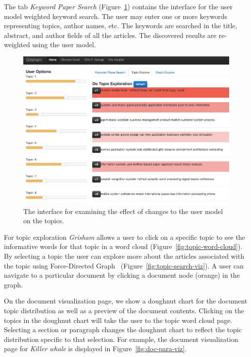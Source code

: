 \documentclass[letterpaper]{article}
\newcommand{\eat}[1]{}
\newcommand{\system}{\textsl{Grisham}\xspace}
\begin{document}
The tab \textsl{Keyword Paper Search} (Figure~\ref{fig:topic_exploration}) contains the interface for the user model weighted keyword search.
The user may enter one or more keywords representing topics,  
author names, etc. The keywords are searched in the title, abstract, 
and author fields of all the articles. The discovered results are  
re-weighted using the user model. 
\eat{
In the first page only a few of 
the articles are displayed in two boxes --- one containing matching words in the title, and the other in the abstract.
Clicking on any box will open up a more complete list of articles.}

\begin{figure}[htb]\centering
\includegraphics[width=.45\textwidth]{topic_exploration.png} %
\caption{The interface for examining the effect of changes to the user model on the topics.}
\label{fig:topic_exploration}
\end{figure}

For topic exploration \system allows a user to click on a specific 
topic to see the informative words for that topic in a word cloud 
(Figure~\ref{fig:topic-word-cloud}). By selecting a topic the user 
can explore more about the articles associated with the topic using 
Force-Directed Graph~\cite{2011-d3} (Figure~\ref{fig:topic-search-viz}).
A user can navigate to a particular document by clicking a document 
node (orange) in the graph. 

On the document visualization page, we show a doughnut chart for the document topic distribution as well as a preview of the document contents.
Clicking on the topics in the doughnut chart will take the user to the topic word cloud page.
Selecting a section or paragraph changes the doughnut chart to reflect the topic distribution specific to that selection.
For example, the document visualization page for \textit{Killer whale} is displayed in Figure~\ref{fig:doc-para-viz}.
\end{document}

